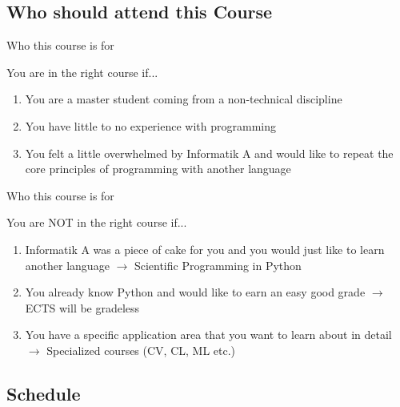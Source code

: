 \subsection{Who should attend this Course}

\begin{frame}{Who this course is for}

    You are in the right course if...
    \newline
    \begin{enumerate}[a]
        \item You are a master student coming from a non-technical discipline
        \item You have little to no experience with programming
        \item You felt a little overwhelmed by Informatik A and would like to repeat the core principles of programming with another language
    \end{enumerate}

\end{frame}

\begin{frame}{Who this course is for}

    You are NOT in the right course if...
    \newline
    \begin{enumerate}[a]
        \item Informatik A was a piece of cake for you and you would just like to learn another language
        \newline $\rightarrow$ Scientific Programming in Python
        \item You already know Python and would like to earn an easy good grade
        \newline $\rightarrow$ ECTS will be gradeless
        \item You have a specific application area that you want to learn about in detail
        \newline $\rightarrow$ Specialized courses (CV, CL, ML etc.)
    \end{enumerate}

\end{frame}

\subsection{Schedule}

